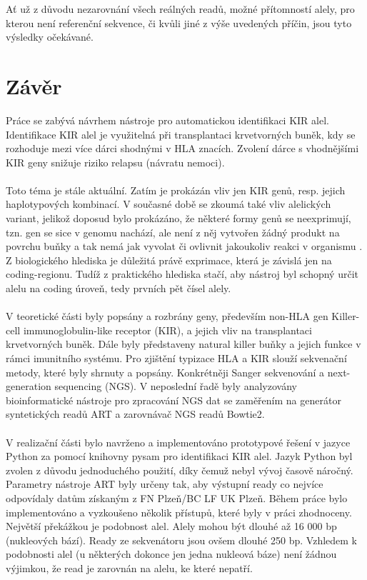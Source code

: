 \documentclass[czech,DP]{thesiskiv}
\numberwithin{equation}{section}
\begin{document}
\noindent
Ať už z důvodu nezarovnání všech reálných readů, možné přítomností alely, pro kterou není referenční sekvence, či kvůli jiné z výše uvedených příčin, jsou tyto výsledky očekávané.


\chapter{Závěr}
Práce se zabývá návrhem nástroje pro automatickou identifikaci KIR alel. Identifikace KIR alel je využitelná při transplantaci krvetvorných buněk, kdy se rozhoduje mezi více dárci shodnými v HLA znacích. Zvolení dárce s vhodnějšími KIR geny snižuje riziko relapsu (návratu nemoci).
\\
\\
Toto téma je stále aktuální. Zatím je prokázán vliv jen KIR genů, resp. jejich haplotypových kombinací. V současné době se zkoumá také vliv alelických variant, jelikož doposud bylo prokázáno, že některé formy genů se neexprimují, tzn. gen se sice v genomu nachází, ale není z něj vytvořen žádný produkt na povrchu buňky a tak nemá jak vyvolat či ovlivnit jakoukoliv reakci v organismu \cite{exprimace_zaver}. Z biologického hlediska je důležitá právě exprimace, která je závislá jen na coding-regionu. Tudíž z praktického hlediska stačí, aby nástroj byl schopný určit alelu na coding úroveň, tedy prvních pět čísel alely. 
\\
\\
V teoretické části byly popsány a rozbrány geny, především non-HLA gen Killer-cell immunoglobulin-like receptor (KIR), a jejich vliv na transplantaci krvetvorných buněk. Dále byly představeny natural killer buňky a jejich funkce v rámci imunitního systému. Pro zjištění typizace HLA a KIR slouží sekvenační metody, které byly shrnuty a popsány. Konkrétněji Sanger sekvenování a next-generation sequencing (NGS). V neposlední řadě byly analyzovány bioinformatické nástroje pro zpracování NGS dat se zaměřením na generátor syntetických readů ART a zarovnávač NGS readů Bowtie2.
\\
\\
V realizační části bylo navrženo a implementováno prototypové řešení v jazyce Python za pomocí knihovny pysam pro identifikaci KIR alel. Jazyk Python byl zvolen z důvodu jednoduchého použití, díky čemuž nebyl vývoj časově náročný. Parametry nástroje ART byly určeny tak, aby výstupní ready co nejvíce odpovídaly datům získaným z FN Plzeň/BC LF UK Plzeň. Během práce bylo implementováno a vyzkoušeno několik přístupů, které byly v práci zhodnoceny. Největší překážkou je podobnost alel. Alely mohou být dlouhé až 16 000 bp (nukleových bází). Ready ze sekvenátoru jsou ovšem dlouhé 250 bp. Vzhledem k podobnosti alel (u některých dokonce jen jedna nukleová báze) není žádnou výjimkou, že read je zarovnán na alelu, ke které nepatří. 
\end{document}
